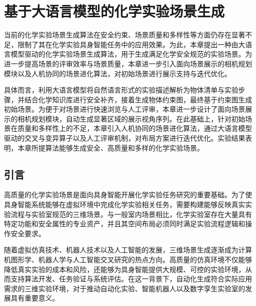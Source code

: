 

\chapter{基于大语言模型的化学实验场景生成}
\label{chap:llm_lab_gen}

当前的化学实验场景生成算法在安全约束、场景质量和多样性等方面仍存在显著不足，限制了其在化学实验具身智能任务中的应用效果。为此，本章提出一种由大语言模型驱动的化学实验场景生成算法，用于生成满足化学安全规范的实验场景。为进一步提高场景的评审效率与场景质量，本章进一步引入面向场景展示的相机规划模块以及人机协同的场景进化算法，对初始场景进行展示支持与迭代优化。

具体而言，利用大语言模型将自然语言形式的实验描述解析为物体清单与实验步骤，并结合化学知识库进行安全补齐，接着生成物体约束图，最终基于约束图生成初始场景。为便于对场景进行快速浏览与人工评审，本章进一步设计了面向场景展示的相机规划模块，自动生成显著区域的展示视角序列。在此基础上，针对初始场景在质量和多样性上的不足，本章引入人机协同的场景进化算法，通过大语言模型驱动的交叉与变异算子以及人工评审机制，对布局方案进行迭代优化。实验结果表明，本章所提算法能够生成安全、高质量和多样的化学实验场景。

\section{引言}

高质量的化学实验场景是面向具身智能开展化学实验任务研究的重要基础。为了使具身智能系统能够在虚拟环境中完成化学实验相关任务，需要构建能够反映真实实验流程与实验室规范的三维场景。与一般室内场景相比，化学实验室存在大量具有特定功能和安全属性的专业资产，并且其空间布局必须同时满足实验流程逻辑和操作安全要求。

随着虚拟仿真技术、机器人技术以及人工智能的发展，三维场景生成逐渐成为计算机图形学、机器人学与人工智能交叉研究的热点方向。高质量的仿真环境不仅能够降低真实实验的成本和风险，还能够为具身智能提供大规模、可控的实验环境，从而支持算法开发、任务验证与系统评估。在这一背景下，自动化生成符合实际应用需求的三维实验环境，对于推动自动化实验、智能机器人以及数字孪生实验室的发展具有重要意义。

